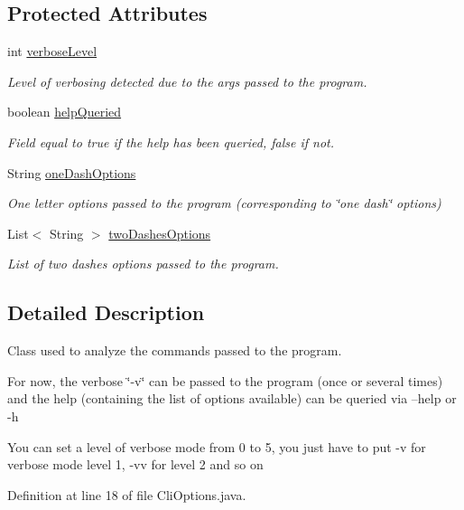 \subsection*{Protected Attributes}
\begin{DoxyCompactItemize}
\item 
int \hyperlink{a00006_a3a7a5235344ee51904e2314dd5fbf7ec}{verbose\-Level}
\begin{DoxyCompactList}\small\item\em Level of verbosing detected due to the args passed to the program. \end{DoxyCompactList}\item 
boolean \hyperlink{a00006_a226c64b5f481ade53599280070c24cf0}{help\-Queried}
\begin{DoxyCompactList}\small\item\em Field equal to true if the help has been queried, false if not. \end{DoxyCompactList}\item 
String \hyperlink{a00006_af118f8dc0f511ad69a7d3889d207a6f3}{one\-Dash\-Options}
\begin{DoxyCompactList}\small\item\em One letter options passed to the program (corresponding to \char`\"{}one dash\char`\"{} options) \end{DoxyCompactList}\item 
List$<$ String $>$ \hyperlink{a00006_af52ecd6d0cb0cafd69f80f311e7d77d4}{two\-Dashes\-Options}
\begin{DoxyCompactList}\small\item\em List of two dashes options passed to the program. \end{DoxyCompactList}\end{DoxyCompactItemize}


\subsection{Detailed Description}
Class used to analyze the commands passed to the program. 

For now, the verbose \char`\"{}-\/v\char`\"{} can be passed to the program (once or several times) and the help (containing the list of options available) can be queried via --help or -\/h 

You can set a level of verbose mode from 0 to 5, you just have to put -\/v for verbose mode level 1, -\/vv for level 2 and so on 

Definition at line 18 of file Cli\-Options.\-java.



